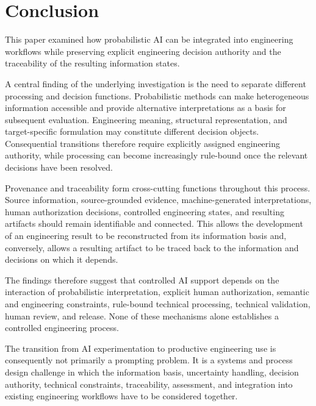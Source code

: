 \section{Conclusion}
\label{sec:conclusion}

This paper examined how probabilistic AI can be integrated into engineering workflows
while preserving explicit engineering decision authority and the traceability of the
resulting information states.

A central finding of the underlying investigation is the need to separate different processing and decision functions.
Probabilistic methods can make heterogeneous information accessible and provide alternative
interpretations as a basis for subsequent evaluation. Engineering meaning, structural
representation, and target-specific formulation may constitute different decision objects.
Consequential transitions therefore require explicitly assigned engineering authority,
while processing can become increasingly rule-bound once the relevant decisions have been
resolved.

Provenance and traceability form cross-cutting functions throughout this process. Source
information, source-grounded evidence, machine-generated interpretations, human
authorization decisions, controlled engineering states, and resulting artifacts should
remain identifiable and connected. This allows the development of an engineering result to
be reconstructed from its information basis and, conversely, allows a resulting artifact
to be traced back to the information and decisions on which it depends.

The findings therefore suggest that controlled AI support depends on the interaction of
probabilistic interpretation, explicit human authorization, semantic and engineering
constraints, rule-bound technical processing, technical validation, human review, and
release. None of
these mechanisms alone establishes a controlled engineering process.

The transition from AI experimentation to productive engineering use is consequently not
primarily a prompting problem. It is a systems and process design challenge in which the
information basis, uncertainty handling, decision authority, technical constraints,
traceability, assessment, and integration into existing engineering workflows have to be
considered together.
